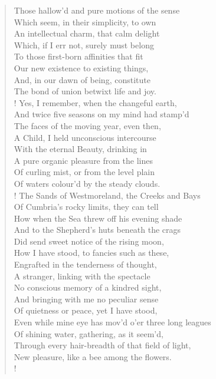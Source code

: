\begin{verse}
Those hallow'd and pure motions of the sense  \\
Which seem, in their simplicity, to own  \\
An intellectual charm, that calm delight  \\
Which, if I err not, surely must belong	  \\
To those first-born affinities that fit  \\
Our new existence to existing things,  \\
And, in our dawn of being, constitute  \\
The bond of union betwixt life and joy.  \\!
Yes, I remember, when the changeful earth,	  \\
And twice five seasons on my mind had stamp'd  \\
The faces of the moving year, even then,  \\
A Child, I held unconscious intercourse  \\
With the eternal Beauty, drinking in  \\
A pure organic pleasure from the lines	  \\
Of curling mist, or from the level plain  \\
Of waters colour'd by the steady clouds.  \\!
The Sands of Westmoreland, the Creeks and Bays  \\
Of Cumbria's rocky limits, they can tell  \\
How when the Sea threw off his evening shade	  \\
And to the Shepherd's huts beneath the crags  \\
Did send sweet notice of the rising moon,  \\
How I have stood, to fancies such as these,  \\
Engrafted in the tenderness of thought,  \\
A stranger, linking with the spectacle	  \\
No conscious memory of a kindred sight,  \\
And bringing with me no peculiar sense  \\
Of quietness or peace, yet I have stood,  \\
Even while mine eye has mov'd o'er three long leagues  \\
Of shining water, gathering, as it seem'd,	  \\
Through every hair-breadth of that field of light,  \\
New pleasure, like a bee among the flowers.  \\!

\end{verse}
